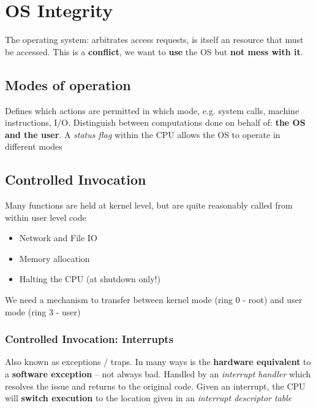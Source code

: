 \documentclass{article}
\begin{document}
\section{OS Integrity}
\begin{flushleft}
The operating system: arbitrates access requests, is itself an resource that must be accessed. This is a \textbf{conflict}, we want to \textbf{use} the OS but \textbf{not mess with it}.
\end{flushleft}

\subsection{Modes of operation}
\begin{flushleft}
Defines which actions are permitted in which mode, e.g. system calls, machine instructions, I/O. Distinguish between computations done on behalf of: \textbf{the OS and the user}. A \textit{status flag} within the CPU allows the OS to operate in different modes
\end{flushleft}

\subsection{Controlled Invocation}
\begin{flushleft}
Many functions are held at kernel level, but are quite reasonably called from within user level code 
\begin{itemize}
  \item Network and File IO 
  \item Memory allocation 
  \item Halting the CPU (at shutdown only!) 
\end{itemize}
We need a mechanism to transfer between kernel mode (ring 0 - root) and user mode (ring 3 - user)
\end{flushleft}

\subsubsection{Controlled Invocation: Interrupts}
\begin{flushleft}
Also known as exceptions / traps. In many ways is the \textbf{hardware equivalent} to a \textbf{software exception} – not always bad. Handled by an \textit{interrupt handler} which resolves the issue and returns to the original code. Given an interrupt, the CPU will \textbf{switch execution} to the location given in an \textit{interrupt descriptor table}
\end{flushleft}
\end{document}
